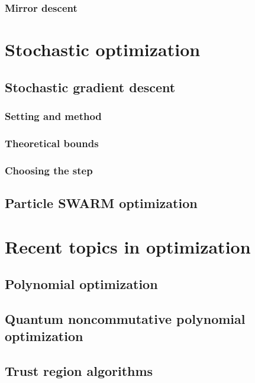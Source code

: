 \documentclass[12pt,openany,oneside]{book}
\theoremstyle{definition}
\numberwithin{definition}{section}
\numberwithin{theorem}{section}
\numberwithin{corollary}{section}
\numberwithin{proposition}{section}
\numberwithin{notation}{section}
\numberwithin{remark}{section}
\numberwithin{hypothesis}{section}
\numberwithin{example}{section}
\begin{document}
\subsection{Mirror descent}

\chapter{Stochastic optimization}

\section{Stochastic gradient descent}
\subsection{Setting and method}
\subsection{Theoretical bounds}
\subsection{Choosing the step}
\section{Particle SWARM optimization}

\chapter{Recent topics in optimization}

\section{Polynomial optimization}
\section{Quantum noncommutative polynomial optimization}
\section{Trust region algorithms}
\end{document}
